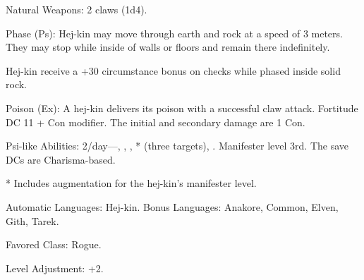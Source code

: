\begin{itemize*}
    \item Natural Weapons: 2 claws (1d4).
    \item Phase (Ps): Hej-kin may move through earth and rock at a speed of 3 meters. They may stop while inside of walls or floors and remain there indefinitely.
	\item Hej-kin receive a +30 circumstance bonus on  checks while phased inside solid rock.
	\item Poison (Ex): A hej-kin delivers its poison with a successful claw attack. Fortitude DC 11 + Con modifier. The initial and secondary damage are 1 Con.
	\item Psi-like Abilities: 2/day---, , , * (three targets), . Manifester level 3rd. The save DCs are Charisma-based.

	* Includes augmentation for the hej-kin's manifester level.
    \item Automatic Languages: Hej-kin. Bonus Languages: Anakore, Common, Elven, Gith, Tarek.
    \item Favored Class: Rogue.
    \item Level Adjustment: +2.
\end{itemize*}
